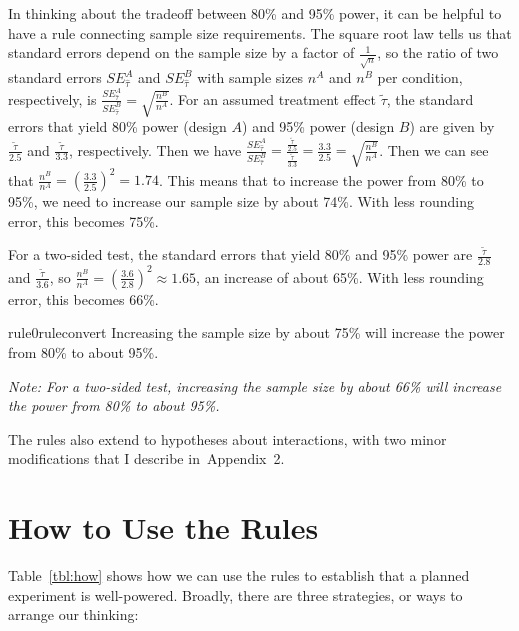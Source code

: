 \documentclass[12pt]{article}
\begin{document}
In thinking about the tradeoff between 80\% and 95\% power, it can be helpful to have a rule connecting sample size requirements.
The square root law tells us that standard errors depend on the sample size by a factor of $\frac{1}{\sqrt{n}}$, so the ratio of two standard errors ${SE}_{\widehat{\tau}}^{A}$ and ${SE}_{\widehat{\tau}}^{B}$ with sample sizes $n^{A}$ and $n^{B}$ per condition, respectively, is $\frac{SE_{\widehat{\tau}}^{A}}{SE_{\widehat{\tau}}^{B}} = \sqrt{\frac{n^{B}}{n^{A}}}$.
For an assumed treatment effect $\widetilde{\tau}$, the standard errors that yield 80\% power (design $A$) and 95\% power (design $B$) are given by $\frac{\widetilde{\tau}}{2.5}$
and $\frac{\widetilde{\tau}}{3.3}$, respectively.
Then we have $\frac{SE_{\widehat{\tau}}^{A}}{SE_{\widehat{\tau}}^{B}} = \frac{\frac{\widetilde{\tau}}{2.5}}{\frac{\widetilde{\tau}}{3.3}} = \frac{3.3}{2.5} = \sqrt{\frac{n^{B}}{n^{A}}}$.
Then we can see that $\frac{n^{B}}{n^{A}} = \left( \frac{3.3}{2.5} \right)^{2} = 1.74$. This means that to increase the power from 80\% to 95\%, we need to increase our sample size by about 74\%.
With less rounding error, this becomes 75\%.

For a two-sided test, the standard errors that yield 80\% and 95\% power are $\frac{\widetilde{\tau}}{2.8}$ and $\frac{\widetilde{\tau}}{3.6}$, so $\frac{n^{B}}{n^{A}} = \left( \frac{3.6}{2.8} \right)^{2} \approx 1.65$, an increase of about 65\%.
With less rounding error, this becomes 66\%.

\begin{restatable}[80\% to 95\% Power]{rule0}{ruleconvert}
\label{rule:80-to-95}
Increasing the sample size by about 75\% will increase the power from 80\% to about 95\%.
\end{restatable}

{\noindent \footnotesize\textit{Note: For a two-sided test, increasing the sample size by about 66\% will increase the power from 80\% to about 95\%.}}

\noindent The rules also extend to hypotheses about interactions, with two minor modifications that I describe in~Appendix~2.

\section*{How to Use the Rules}

Table~\ref{tbl:how} shows how we can use the rules to establish that a planned experiment is well-powered. Broadly, there are three strategies, or ways to arrange our thinking:
\end{document}
